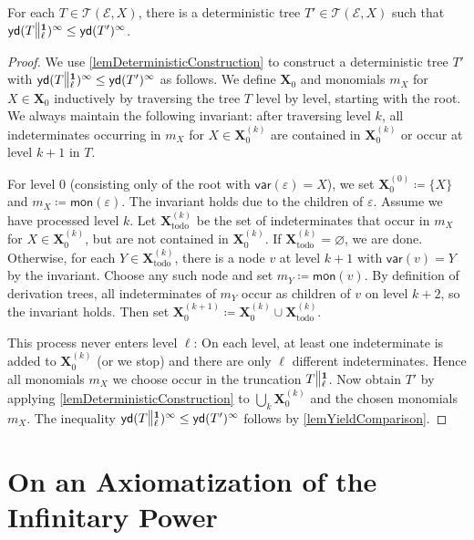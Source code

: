 \documentclass[english,runningheads,a4paper,envcountsame]{llncs}
\renewcommand{\emptyset}{\varnothing}
\newcommand*{\XX}{{\bm X}}
\newcommand*{\EE}{\mathcal{E}}
\renewcommand*{\root}{\varepsilon}
\newcommand*{\yield}{\mathsf{yd}}
\newcommand*{\mon}{\mathsf{mon}}
\newcommand*{\var}{\mathsf{var}}
\newcommand*{\Trees}{\mathcal{T}}
\newcommand{\cut}[2]{\scalebox{1}[1.3]{$\|$}\vphantom{|}_{#1}^{#2}}
\newcommand{\one}{\tup 1}
\newcommand*{\tup}[1]{\mathbf{#1}}
\begin{document}
\begingroup
\renewcommand{\thecorollary}{\ref{lemDeterministicExists}}
\addtocounter{theorem}{-1}
\begin{corollary}
For each $T \in \Trees(\EE,X)$, there is a deterministic tree $T' \in \Trees(\EE, X)$ such that $\yield(T \cut \ell \one)^\infty \le \yield(T')^\infty$.
\end{corollary}
\endgroup
\begin{proof}
We use \cref{lemDeterministicConstruction} to construct a deterministic tree $T'$ with $\yield(T \cut \ell \one)^\infty \le \yield(T')^\infty$ as follows.
We define $\XX_0$ and monomials $m_X$ for $X \in \XX_0$ inductively by traversing the tree $T$ level by level, starting with the root.
We always maintain the following invariant: after traversing level $k$, all indeterminates occurring in $m_X$ for $X \in \XX_0^{(k)}$ are contained in $\XX_0^{(k)}$ or occur at level $k+1$ in $T$.

For level $0$ (consisting only of the root with $\var(\root) = X$), we set $\XX_0^{(0)} \coloneqq \{X\}$ and $m_X \coloneqq \mon(\root)$.
The invariant holds due to the children of $\root$.
%
Assume we have processed level $k$.
Let $\XX_{\text{todo}}^{(k)}$ be the set of indeterminates that occur in $m_X$ for $X \in \XX_0^{(k)}$, but are not contained in $\XX_0^{(k)}$.
If $\XX_{\text{todo}}^{(k)} = \emptyset$, we are done.
Otherwise, for each $Y \in \XX_{\text{todo}}^{(k)}$, there is a node $v$ at level $k+1$ with $\var(v) = Y$ by the invariant.
Choose any such node and set $m_Y \coloneqq \mon(v)$.
By definition of derivation trees, all indeterminates of $m_Y$ occur as children of $v$ on level $k+2$, so the invariant holds.
Then set $\XX_0^{(k+1)} \coloneqq \XX_0^{(k)} \cup \XX_{\text{todo}}^{(k)}$.

This process never enters level $\ell$:
On each level, at least one indeterminate is added to $\XX_0^{(k)}$ (or we stop) and there are only $\ell$ different indeterminates.
Hence all monomials $m_X$ we choose occur in the truncation $T \cut \ell \one$.
Now obtain $T'$ by applying \cref{lemDeterministicConstruction} to $\bigcup_k \XX_0^{(k)}$ and the chosen monomials $m_X$. The inequality $\yield(T \cut \ell \one)^\infty \le \yield(T')^\infty$ follows by \cref{lemYieldComparison}.
\end{proof}




\section{On an Axiomatization of the Infinitary Power}
\label{Appendix:Infpow}
\newcommand{\infpow}{{}^\infty}
\end{document}
